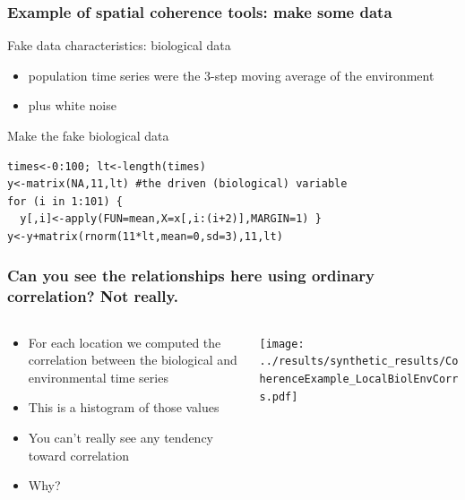 \documentclass{beamer}
\begin{document}
\begin{frame}[fragile]
\frametitle{Example of spatial coherence tools: make some data}
\begin{block}{Fake data characteristics: biological data}
\begin{itemize}
\item population time series were the 3-step moving average of the environment 
\item plus white noise
\end{itemize}
\end{block}
\begin{exampleblock}{Make the fake biological data}
\begin{verbatim}
times<-0:100; lt<-length(times)
y<-matrix(NA,11,lt) #the driven (biological) variable
for (i in 1:101) {
  y[,i]<-apply(FUN=mean,X=x[,i:(i+2)],MARGIN=1) }
y<-y+matrix(rnorm(11*lt,mean=0,sd=3),11,lt)
\end{verbatim}
\end{exampleblock}
\end{frame}

\begin{frame}
\frametitle{Can you see the relationships here using ordinary correlation? Not really.}
\begin{columns}[c]
\begin{column}{5cm}
\begin{itemize}
\item For each location we computed the correlation between the biological and environmental time series
\item This is a histogram of those values
\item You can't really see any tendency toward correlation
\item Why?
\end{itemize}
\end{column}
\begin{column}{7cm}
\texttt{[image: ../results/synthetic\_results/CoherenceExample\_LocalBiolEnvCorrs.pdf]}
\end{column}
\end{columns}
\end{frame}
\end{document}
